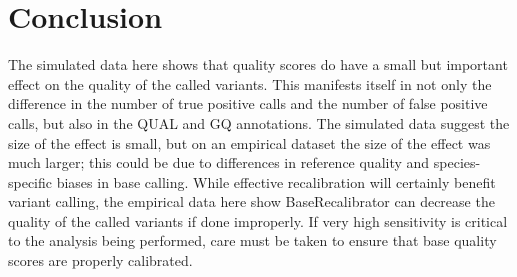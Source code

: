 \section{Conclusion}

The simulated data here shows that quality scores do have a small but important effect on the quality of the called variants. This manifests itself in not only the difference in the number of true positive calls and the number of false positive calls, but also in the QUAL and GQ annotations. The simulated data suggest the size of the effect is small, but on an empirical dataset the size of the effect was much larger; this could be due to differences in reference quality and species-specific biases in base calling. While effective recalibration will certainly benefit variant calling, the empirical data here show BaseRecalibrator can decrease the quality of the called variants if done improperly. If very high sensitivity is critical to the analysis being performed, care must be taken to ensure that base quality scores are properly calibrated.

\printbibliography[segment=\therefsegment]{}
